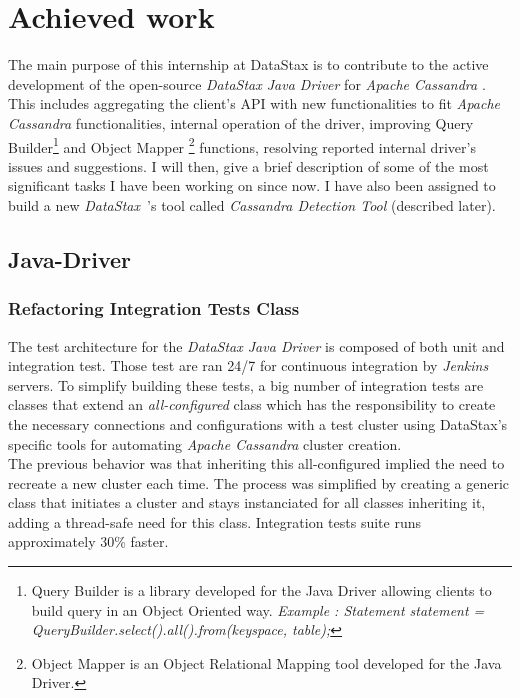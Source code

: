 \documentclass[a4paper]{report}
\newcommand{\ds}{\emph{\mbox{DataStax }}}
\newcommand{\djd}{\emph{DataStax Java Driver }}
\newcommand{\ca}{\emph{Apache Cassandra }}
\begin{document}
\chapter{Achieved work}
The main purpose of this internship at DataStax is to contribute to the active development of the open-source \djd for \ca. This includes aggregating the client's API with new functionalities to fit \ca functionalities, internal operation of the driver, improving Query Builder\footnote{Query Builder is a library developed for the Java Driver allowing clients to build query in an Object Oriented way. \textit{Example : Statement statement = QueryBuilder.select().all().from(keyspace, table);}} 
and Object Mapper \footnote{Object Mapper is an Object Relational Mapping tool developed for the Java Driver.} 
functions, resolving reported internal driver's issues and suggestions. I will then, give a brief description of some of the most significant tasks I have been working on since now. I have also been assigned to build a new \ds's tool called \emph{Cassandra Detection Tool} (described later).

\section{Java-Driver}
\subsection{Refactoring Integration Tests Class}
The test architecture for the \djd is composed of both unit and integration test. Those test are ran 24/7 for continuous integration by \emph{Jenkins} servers. To simplify building these tests, a big number of integration tests are classes that extend an \emph{all-configured} class which has the responsibility to create the necessary connections and configurations with a test cluster using DataStax's specific tools for automating \ca cluster creation.\\
The previous behavior was that inheriting this all-configured implied the need to recreate a new cluster each time. The process was simplified by creating a generic class that initiates a cluster and stays instanciated for all classes inheriting it, adding a thread-safe need for this class. Integration tests suite runs approximately 30\% faster.
\end{document}
